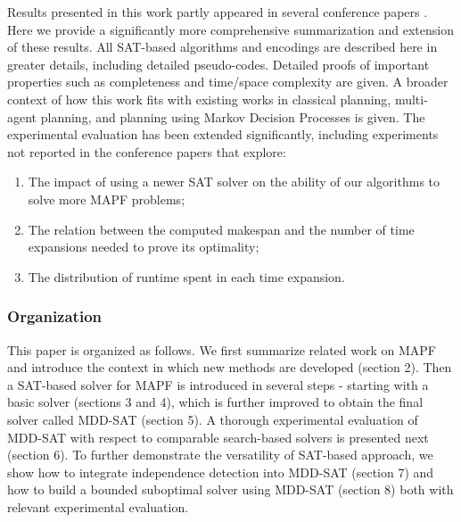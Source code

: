 \documentclass[jair,oneside,11pt]{article}
\newcommand{\commenter}[3]{$[$\uppercase{#1}#2:#3$]$  \\}
\newcommand{\roni}[2]{\commenter{roni}{#1}{#2}}
\begin{document}
Results presented in this work partly appeared in several conference papers \cite{DBLP:conf/ecai/SurynekFSB16,DBLP:conf/socs/SurynekFSB16,DBLP:conf/socs/SurynekFSB17,DBLP:conf/icaart/SurynekSFB17a,DBLP:conf/icaart/SurynekSFB17}. 
Here we provide a significantly more comprehensive summarization and extension of these results. 
All SAT-based algorithms and encodings are described here in greater details, including detailed pseudo-codes. 
Detailed proofs of important properties such as completeness and time/space complexity are given. 
A broader context of how this work fits with existing works in classical planning, multi-agent planning, and planning using Markov Decision Processes is given. 
The experimental evaluation has been extended significantly, including experiments not reported in the conference papers that explore:
\begin{enumerate}[label=(\roman*)]
\item The impact of using a newer SAT solver on the ability of our algorithms to solve more MAPF problems;
\item The relation between the computed makespan and the number of time expansions needed to prove its optimality;
\item The distribution of runtime spent in each time expansion.
\end{enumerate}





\subsubsection{Organization}

This paper is organized as follows. We first summarize related work on MAPF and introduce the context in which new methods are developed (section 2). Then a SAT-based solver for MAPF is introduced in several steps - starting with a basic solver (sections 3 and 4), which is further improved to obtain the final solver called MDD-SAT (section 5). A thorough experimental evaluation of MDD-SAT with respect to comparable search-based solvers is presented next (section 6). To further demonstrate the versatility of SAT-based approach, we show how to integrate independence detection into MDD-SAT (section 7) and how to build a bounded suboptimal solver using MDD-SAT (section 8) both with relevant experimental evaluation.
\end{document}
